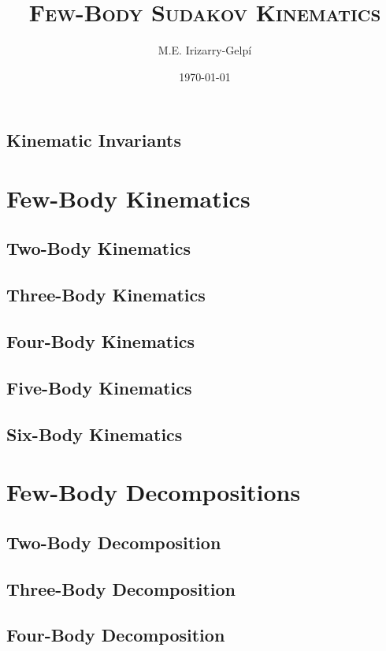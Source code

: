 \documentclass[letterpaper, 12pt]{report}
\begin{document}
\title{\Huge\textsc{Few-Body Sudakov Kinematics}}
\author{M.E. Irizarry-Gelp\'{i}}
\date{\today}

\maketitle
\tableofcontents


\chapter{Kinematic Invariants}

\part{Few-Body Kinematics}

\chapter{Two-Body Kinematics}
\chapter{Three-Body Kinematics}
\chapter{Four-Body Kinematics}
\chapter{Five-Body Kinematics}
\chapter{Six-Body Kinematics}

\part{Few-Body Decompositions}

\chapter{Two-Body Decomposition}
\chapter{Three-Body Decomposition}
\chapter{Four-Body Decomposition}
\end{document}

